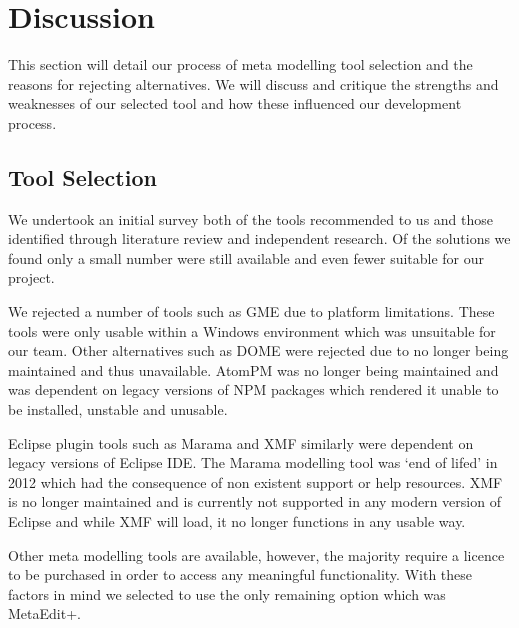 \section{Discussion}
This section will detail our process of meta modelling tool selection and the reasons for rejecting alternatives. We will discuss and critique the strengths and weaknesses of our selected tool and how these influenced our development process.\par
\subsection{Tool Selection}
We undertook an initial survey both of the tools recommended to us and those identified through literature review and independent research. Of the solutions we found only a small number were still available and even fewer suitable for our project.\par
We rejected a number of tools such as GME due to platform limitations. These tools were only usable within a Windows environment which was unsuitable for our team. Other alternatives such as DOME were rejected due to no longer being maintained and thus unavailable. AtomPM was no longer being maintained and was dependent on legacy versions of NPM packages which rendered it unable to be installed, unstable and unusable.\par Eclipse plugin tools such as Marama and XMF similarly were dependent on legacy versions of Eclipse IDE. The Marama modelling tool was `end of lifed' in 2012 which had the consequence of non existent support or help resources. XMF is no longer maintained and is currently not supported in any modern version of Eclipse and while XMF will load, it no longer functions in any usable way. \par
Other meta modelling tools are available, however, the majority require a licence to be purchased in order to access any meaningful functionality. With these factors in mind we selected to use the only remaining option which was MetaEdit+.

